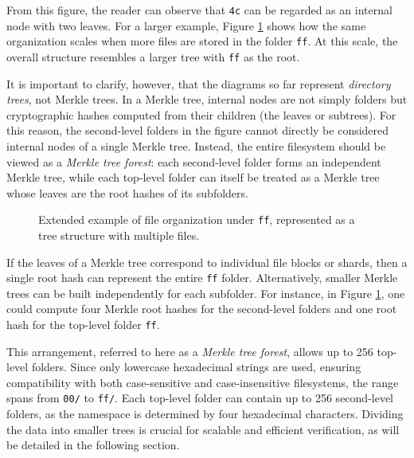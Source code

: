 From this figure, the reader can observe that \texttt{4c} can be regarded as an internal node with two leaves. For a larger example, Figure \ref{fig:file-organization-example-in-tree-2} shows how the same organization scales when more files are stored in the folder \texttt{ff}. At this scale, the overall structure resembles a larger tree with \texttt{ff} as the root.  

It is important to clarify, however, that the diagrams so far represent \emph{directory trees}, not Merkle trees. In a Merkle tree, internal nodes are not simply folders but cryptographic hashes computed from their children (the leaves or subtrees). For this reason, the second-level folders in the figure cannot directly be considered internal nodes of a single Merkle tree. Instead, the entire filesystem should be viewed as a \emph{Merkle tree forest}: each second-level folder forms an independent Merkle tree, while each top-level folder can itself be treated as a Merkle tree whose leaves are the root hashes of its subfolders.

\begin{figure}[h]
\centering
{}
\caption{Extended example of file organization under \texttt{ff}, represented as a tree structure with multiple files.}
\label{fig:file-organization-example-in-tree-2}
\end{figure}

If the leaves of a Merkle tree correspond to individual file blocks or shards, then a single root hash can represent the entire \texttt{ff} folder. Alternatively, smaller Merkle trees can be built independently for each subfolder. For instance, in Figure \ref{fig:file-organization-example-in-tree-2}, one could compute four Merkle root hashes for the second-level folders and one root hash for the top-level folder \texttt{ff}.

This arrangement, referred to here as a \emph{Merkle tree forest}, allows up to 256 top-level folders. Since only lowercase hexadecimal strings are used, ensuring compatibility with both case-sensitive and case-insensitive filesystems, the range spans from \texttt{00/} to \texttt{ff/}. Each top-level folder can contain up to 256 second-level folders, as the namespace is determined by four hexadecimal characters. Dividing the data into smaller trees is crucial for scalable and efficient verification, as will be detailed in the following section.

